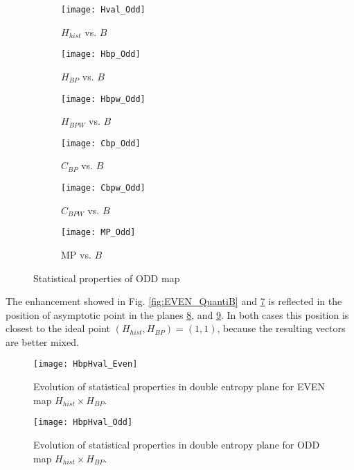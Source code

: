 \begin{figure}[htpb]
	\centering
	\begin{subfigure}[b]{0.49\textwidth}
		\texttt{[image: Hval\_Odd]}
		\caption{$H_{hist}$ vs. $B$}
		\label{fig:Hval_Odd}
	\end{subfigure}
	\begin{subfigure}[b]{0.49\textwidth}
		\texttt{[image: Hbp\_Odd]}
		\caption{$H_{BP}$ vs. $B$}
		\label{fig:Hbp_Odd}
	\end{subfigure}
	\begin{subfigure}[b]{0.49\textwidth}
		\texttt{[image: Hbpw\_Odd]}
		\caption{$H_{BPW}$ vs. $B$}
		\label{fig:Hbpw_Odd}
	\end{subfigure}
	\begin{subfigure}[b]{0.49\textwidth}
		\texttt{[image: Cbp\_Odd]}
		\caption{$C_{BP}$ vs. $B$}
		\label{fig:Cbp_Odd}
	\end{subfigure}
	\begin{subfigure}[b]{0.49\textwidth}
		\texttt{[image: Cbpw\_Odd]}
		\caption{$C_{BPW}$ vs. $B$}
		\label{fig:Cbpw_Odd}
	\end{subfigure}
	\begin{subfigure}[b]{0.49\textwidth}
		\texttt{[image: MP\_Odd]}
		\caption{MP vs. $B$}
		\label{fig:MP_Odd}
	\end{subfigure}
	\caption{Statistical properties of ODD map}
	\label{fig:ODD_QuantiB}
\end{figure}

The enhancement showed in Fig. \ref{fig:EVEN_QuantiB} and \ref{fig:ODD_QuantiB} is reflected in the position of asymptotic point in the planes \ref{fig:EVEN_HH}, and \ref{fig:ODD_HH}.
In both cases this position is closest to the ideal point $(H_{hist}, H_{BP})=(1, 1)$, because the resulting vectors are better mixed.

\begin{figure}[htpb]
	\centering
	\texttt{[image: HbpHval\_Even]}
	\caption{Evolution of statistical properties in double entropy plane for EVEN map $H_{hist} \times H_{BP}$.}
	\label{fig:EVEN_HH}
\end{figure}

\begin{figure}[htpb]
	\centering
	\texttt{[image: HbpHval\_Odd]}
	\caption{Evolution of statistical properties in double entropy plane for ODD map $H_{hist} \times H_{BP}$.}
	\label{fig:ODD_HH}
\end{figure}

